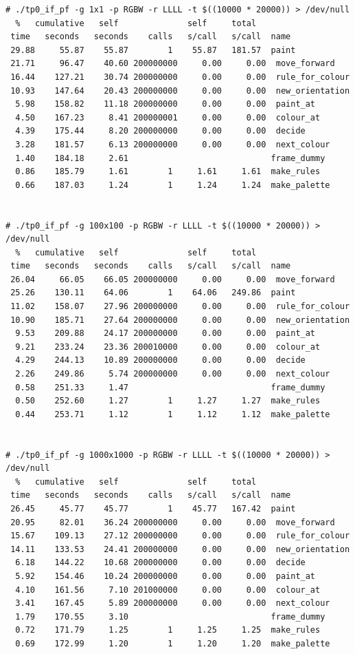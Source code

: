 \documentclass[a4paper, 10pt, twoside, notitlepage]{article}
\begin{document}
\scriptsize
\begin{verbatim}
# ./tp0_if_pf -g 1x1 -p RGBW -r LLLL -t $((10000 * 20000)) > /dev/null
  %   cumulative   self              self     total           
 time   seconds   seconds    calls   s/call   s/call  name    
 29.88     55.87    55.87        1    55.87   181.57  paint
 21.71     96.47    40.60 200000000     0.00     0.00  move_forward
 16.44    127.21    30.74 200000000     0.00     0.00  rule_for_colour
 10.93    147.64    20.43 200000000     0.00     0.00  new_orientation
  5.98    158.82    11.18 200000000     0.00     0.00  paint_at
  4.50    167.23     8.41 200000001     0.00     0.00  colour_at
  4.39    175.44     8.20 200000000     0.00     0.00  decide
  3.28    181.57     6.13 200000000     0.00     0.00  next_colour
  1.40    184.18     2.61                             frame_dummy
  0.86    185.79     1.61        1     1.61     1.61  make_rules
  0.66    187.03     1.24        1     1.24     1.24  make_palette


# ./tp0_if_pf -g 100x100 -p RGBW -r LLLL -t $((10000 * 20000)) > /dev/null
  %   cumulative   self              self     total           
 time   seconds   seconds    calls   s/call   s/call  name    
 26.04     66.05    66.05 200000000     0.00     0.00  move_forward
 25.26    130.11    64.06        1    64.06   249.86  paint
 11.02    158.07    27.96 200000000     0.00     0.00  rule_for_colour
 10.90    185.71    27.64 200000000     0.00     0.00  new_orientation
  9.53    209.88    24.17 200000000     0.00     0.00  paint_at
  9.21    233.24    23.36 200010000     0.00     0.00  colour_at
  4.29    244.13    10.89 200000000     0.00     0.00  decide
  2.26    249.86     5.74 200000000     0.00     0.00  next_colour
  0.58    251.33     1.47                             frame_dummy
  0.50    252.60     1.27        1     1.27     1.27  make_rules
  0.44    253.71     1.12        1     1.12     1.12  make_palette


# ./tp0_if_pf -g 1000x1000 -p RGBW -r LLLL -t $((10000 * 20000)) > /dev/null
  %   cumulative   self              self     total           
 time   seconds   seconds    calls   s/call   s/call  name    
 26.45     45.77    45.77        1    45.77   167.42  paint
 20.95     82.01    36.24 200000000     0.00     0.00  move_forward
 15.67    109.13    27.12 200000000     0.00     0.00  rule_for_colour
 14.11    133.53    24.41 200000000     0.00     0.00  new_orientation
  6.18    144.22    10.68 200000000     0.00     0.00  decide
  5.92    154.46    10.24 200000000     0.00     0.00  paint_at
  4.10    161.56     7.10 201000000     0.00     0.00  colour_at
  3.41    167.45     5.89 200000000     0.00     0.00  next_colour
  1.79    170.55     3.10                             frame_dummy
  0.72    171.79     1.25        1     1.25     1.25  make_rules
  0.69    172.99     1.20        1     1.20     1.20  make_palette



\end{verbatim}
\end{document}
